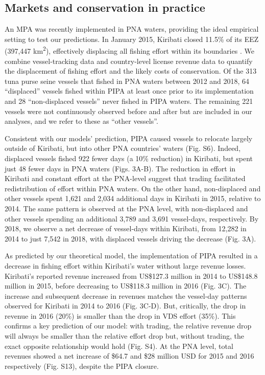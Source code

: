 \documentclass[12pt]{article}
\begin{document}
\subsection{Markets and conservation in practice}

An MPA was recently implemented in PNA waters, providing the ideal empirical setting to test our predictions. In January 2015, Kiribati closed 11.5\% of its EEZ (397,447 km\textsuperscript{2}), effectively displacing all fishing effort within its boundaries \cite{mccauley_2016,mcdermott_2018}. We combine vessel-tracking data \cite{kroodsma_2018} and country-level license revenue data \cite{ffa_2017} to quantify the displacement of fishing effort and the likely costs of conservation. Of the 313 tuna purse seine vessels that fished in PNA waters between 2012 and 2018, 64 ``displaced'' vessels fished within PIPA at least once prior to its implementation and 28 ``non-displaced vessels'' never fished in PIPA waters. The remaining 221 vessels were not continuously observed before and after but are included in our analyses, and we refer to these as ``other vessels''.

Consistent with our models' prediction, PIPA caused vessels to relocate largely outside of Kiribati, but into other PNA countries' waters (Fig. S6). Indeed, displaced vessels fished 922 fewer days (a 10\% reduction) in Kiribati, but spent just 48 fewer days in PNA waters (Figs. 3A-B).  The reduction in effort in Kiribati and constant effort at the PNA-level suggest that trading facilitated redistribution of effort within PNA waters. On the other hand, non-displaced and other vessels spent 1,621 and 2,034 additional days in Kiribati in 2015, relative to 2014. The same pattern is observed at the PNA level, with non-displaced and other vessels spending an additional 3,789 and 3,691 vessel-days, respectively. By 2018, we observe a net decrease of vessel-days within Kiribati, from 12,282 in 2014 to just 7,542 in 2018, with displaced vessels driving the decrease (Fig. 3A).

As predicted by our theoretical model, the implementation of PIPA resulted in a decrease in fishing effort within Kiribati's water without large revenue losses. Kiribati's reported revenue increased from US\$127.3 million in 2014 to US\$148.8 million in 2015, before decreasing to US\$118.3 million in 2016 (Fig. 3C).
The increase and subsequent decrease in revenues matches the vessel-day patterns observed for Kiribati in 2014 to 2016 (Fig. 3C-D). But, critically, the drop in revenue in 2016 (20\%) is smaller than the drop in VDS effort (35\%). This confirms a key prediction of our model: with trading, the relative revenue drop will always be smaller than the relative effort drop but, without trading, the exact opposite relationship would hold (Fig. S4). At the PNA level, total revenues showed a net increase of \$64.7 and \$28 million USD for 2015 and 2016 respectively (Fig. S13), despite the PIPA closure.
\end{document}
